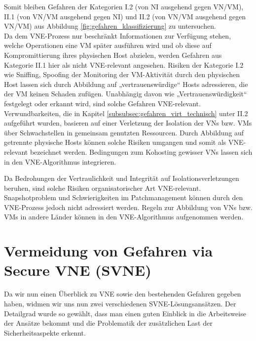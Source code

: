 \documentclass{lni}
\begin{document}
Somit bleiben Gefahren der Kategorien I.2 (von NI ausgehend gegen VN/VM), II.1 (von VN/VM ausgehend gegen NI) und II.2 (von VN/VM ausgehend gegen VN/VM) aus Abbildung \ref{fig:gefahren_klassifizierung} zu untersuchen.\\
Da dem VNE-Prozess nur beschränkt Informationen zur Verfügung stehen, welche Operationen eine VM später ausführen wird und ob diese auf Kompromittierung ihres physischen Host abzielen, werden Gefahren aus Kategorie II.1 hier als nicht VNE-relevant angesehen. 
Risiken der Kategorie I.2 wie Sniffing, Spoofing der Monitoring der VM-Aktivität durch den physischen Host lassen sich durch Abbildung auf „vertrauenswürdige“ Hosts adressieren, die der VM keinen Schaden zufügen. Unabhängig davon wie „Vertrauenswürdigkeit“ festgelegt oder erkannt wird, sind solche Gefahren VNE-relevant.\\
Verwundbarkeiten, die in Kapitel \ref{subsubsec:gefahren_virt_technisch} unter II.2 aufgeführt wurden, basieren auf einer Verletzung der Isolation der VNs bzw. VMs über Schwachstellen in gemeinsam genutzten Ressourcen. Durch Abbildung auf getrennte physische Hosts können solche Risiken umgangen und somit als VNE-relevant bezeichnet werden. Bedingungen zum Kohosting gewisser VNs lassen sich in den VNE-Algorithmus integrieren. 

Da Bedrohungen der Vertraulichkeit und Integrität auf Isolationsverletzungen beruhen, sind solche Risiken organisatorischer Art VNE-relevant. Snapshotproblem und Schwierigkeiten im Patchmanagement können durch den VNE-Prozess jedoch nicht adressiert werden.
Regeln zur Abbildung von VNs bzw. VMs in andere Länder können in den VNE-Algorithmus aufgenommen werden.

%
%
%


\section{Vermeidung von Gefahren via Secure VNE (SVNE)}
\label{sec:svne}
Da wir nun einen Überblick zu VNE sowie den bestehenden Gefahren gegeben haben, widmen wir uns nun zwei verschiedenen SVNE-Lösungsansätzen. Der Detailgrad wurde so gewählt, dass man einen guten Einblick in die Arbeitsweise der Ansätze bekommt und die Problematik der zusätzlichen Last der Sicherheitsaspekte erkennt.
\end{document}
